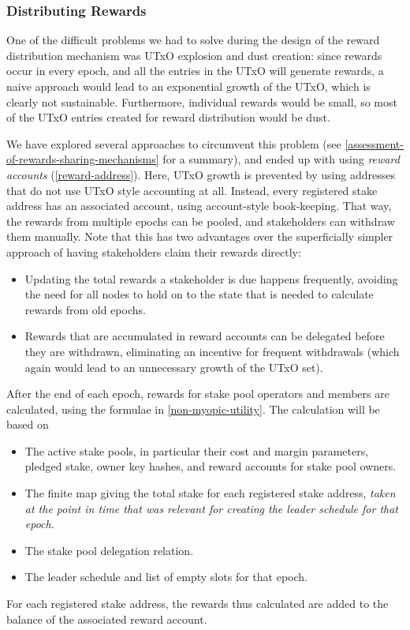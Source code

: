 \documentclass[11pt,a4paper,dvipsnames,twosided]{article}
\begin{document}
\subsubsection{Distributing Rewards}
\label{distributing-rewards}

One of the difficult problems we had to solve during the design of the
reward distribution mechanism was UTxO explosion and dust creation:
since rewards occur in every epoch, and all the entries in the UTxO
will generate rewards, a naive approach would lead to an exponential
growth of the UTxO, which is clearly not sustainable. Furthermore,
individual rewards would be small, so most of the UTxO entries created
for reward distribution would be dust.

We have explored several approaches to circumvent this problem
(see \cref{assessment-of-rewards-sharing-mechanisms} for a summary),
and ended up with using \emph{reward accounts}
(\cref{reward-address}). Here, UTxO growth is prevented by using
addresses that do not use UTxO style accounting at all. Instead, every
registered stake address has an associated account, using
account-style book-keeping. That way, the rewards from multiple epochs
can be pooled, and stakeholders can withdraw them manually. Note that
this has two advantages over the superficially simpler approach of
having stakeholders claim their rewards directly:
\begin{itemize}
\item Updating the total rewards a stakeholder is due happens
  frequently, avoiding the need for all nodes to hold on to the state
  that is needed to calculate rewards from old epochs.
\item Rewards that are accumulated in reward accounts can be delegated before
  they are withdrawn, eliminating an incentive for
  frequent withdrawals (which again would lead to an unnecessary
  growth of the UTxO set).
\end{itemize}

After the end of each epoch, rewards for stake pool operators and members are
calculated, using the formulae in \cref{non-myopic-utility}. The calculation
will be based on
\begin{itemize}
\item The active stake pools, in particular their cost and margin parameters,
  pledged stake, owner key hashes, and reward accounts for stake pool owners.
\item The finite map giving the total stake for each registered
  stake address, \emph{taken at the point in time that was relevant for
    creating the leader schedule for that epoch}.
\item The stake pool delegation relation.
\item The leader schedule and list of empty slots for that epoch.
\end{itemize}
For each registered stake address, the rewards thus calculated are added
to the balance of the associated reward account.
\end{document}
